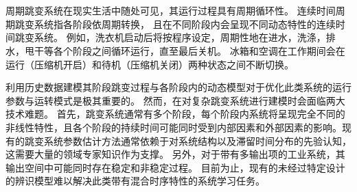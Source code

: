 
\chapter{\TitlechapterIV}
周期跳变系统在现实生活中随处可见，其运行过程具有周期循环性。
连续时间周期跳变系统指各阶段依周期转换，
且在不同阶段内会呈现不同动态特性的连续时间跳变系统。
例如，洗衣机启动后将按程序设定，周期性地在进水，洗涤，排水，甩干等各个阶段之间循环运行，直至最后关机。
冰箱和空调在工作期间会在运行（压缩机开启）和待机（压缩机关闭）两种状态之间不断切换。

利用历史数据建模其阶段跳变过程与各阶段内的动态模型对于优化此类系统的运行参数与运转模式是极其重要的。
然而，在对复杂跳变系统进行建模时会面临两大技术难题。
首先，跳变系统通常有多个阶段，每个阶段内系统将呈现完全不同的非线性特性，且各个阶段的持续时间可能同时受到内部因素和外部因素的影响\cite{WANG2022111790}。现有的跳变系统参数估计方法\cite{balenzuela2022parameter}通常依赖于对系统结构以及滞留时间分布的先验认知，这需要大量的领域专家知识作为支撑。
另外，对于带有多输出项的工业系统，其输出空间中可能同时存在稳定和非稳定过程\cite{nason2006stationary}。
目前为止，现有的未经过特定设计的辨识模型难以解决此类带有混合时序特性的系统学习任务。

